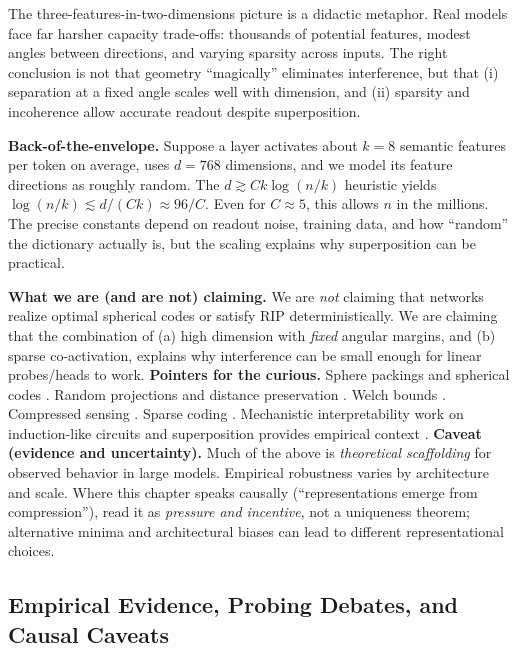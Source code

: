 The three-features-in-two-dimensions picture is a didactic metaphor. Real models face far harsher capacity trade-offs: thousands of potential features, modest angles between directions, and varying sparsity across inputs. The right conclusion is not that geometry ``magically'' eliminates interference, but that (i) separation at a fixed angle scales well with dimension, and (ii) sparsity and incoherence allow accurate readout despite superposition.
\begin{examplebox}
\textbf{Back-of-the-envelope.} Suppose a layer activates about $k\!=\!8$ semantic features per token on average, uses $d\!=\!768$ dimensions, and we model its feature directions as roughly random. The $d \gtrsim C k \log(n/k)$ heuristic yields $\log(n/k) \lesssim d/(Ck)\approx 96/C$. Even for $C\!\approx\!5$, this allows $n$ in the millions. The precise constants depend on readout noise, training data, and how ``random'' the dictionary actually is, but the scaling explains why superposition can be practical.
\end{examplebox}
\textbf{What we are (and are not) claiming.}
We are \emph{not} claiming that networks realize optimal spherical codes or satisfy RIP deterministically. We are claiming that the combination of (a) high dimension with \emph{fixed} angular margins, and (b) sparse co-activation, explains why interference can be small enough for linear probes/heads to work.
\textbf{Pointers for the curious.}
Sphere packings and spherical codes \citep{kabatiansky1978,delsarte1977}. Random projections and distance preservation \citep{johnson1984}. Welch bounds \citep{welch1974}. Compressed sensing \citep{candes2006,donoho2006,baraniuk2007}. Sparse coding \citep{olshausen1996}. Mechanistic interpretability work on induction-like circuits and superposition provides empirical context \citep{elhage2021circuits,olsson2022icl}.
\textbf{Caveat (evidence and uncertainty).}
Much of the above is \emph{theoretical scaffolding} for observed behavior in large models. Empirical robustness varies by architecture and scale. Where this chapter speaks causally (``representations emerge from compression''), read it as \emph{pressure and incentive}, not a uniqueness theorem; alternative minima and architectural biases can lead to different representational choices.

\vspace{1em}
\subsection{Empirical Evidence, Probing Debates, and Causal Caveats}

